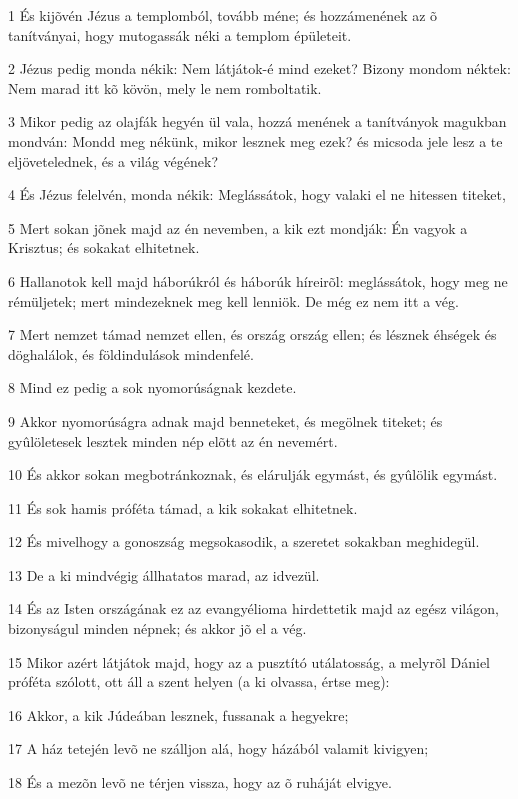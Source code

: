 \par 1 És kijõvén Jézus a templomból, tovább méne; és hozzámenének az õ tanítványai, hogy mutogassák néki a templom épületeit.
\par 2 Jézus pedig monda nékik: Nem látjátok-é mind ezeket? Bizony mondom néktek: Nem marad itt kõ kövön, mely le nem romboltatik.
\par 3 Mikor pedig az olajfák hegyén ül vala, hozzá menének a tanítványok magukban mondván: Mondd meg nékünk, mikor lesznek meg ezek? és micsoda jele lesz a te eljövetelednek, és a világ végének?
\par 4 És Jézus felelvén, monda nékik: Meglássátok, hogy valaki el ne hitessen titeket,
\par 5 Mert sokan jõnek majd az én nevemben, a kik ezt mondják: Én vagyok a Krisztus; és sokakat elhitetnek.
\par 6 Hallanotok kell majd háborúkról és háborúk híreirõl: meglássátok, hogy meg ne rémüljetek; mert mindezeknek meg kell lenniök. De még ez nem itt a vég.
\par 7 Mert nemzet támad nemzet ellen, és ország ország ellen; és lésznek éhségek és döghalálok, és földindulások mindenfelé.
\par 8 Mind ez pedig a sok nyomorúságnak kezdete.
\par 9 Akkor nyomorúságra adnak majd benneteket, és megölnek titeket; és gyûlöletesek lesztek minden nép elõtt az én nevemért.
\par 10 És akkor sokan megbotránkoznak, és elárulják egymást, és gyûlölik egymást.
\par 11 És sok hamis próféta támad, a kik sokakat elhitetnek.
\par 12 És mivelhogy a gonoszság megsokasodik, a szeretet sokakban meghidegül.
\par 13 De a ki mindvégig állhatatos marad, az idvezül.
\par 14 És az Isten országának ez az evangyélioma hirdettetik majd az egész világon,  bizonyságul minden népnek; és akkor jõ el a vég.
\par 15 Mikor azért látjátok majd, hogy az a pusztító utálatosság, a melyrõl Dániel próféta szólott, ott áll a szent helyen (a ki olvassa, értse meg):
\par 16 Akkor, a kik Júdeában lesznek, fussanak a hegyekre;
\par 17 A ház tetején levõ ne szálljon alá, hogy házából valamit kivigyen;
\par 18 És a mezõn levõ ne térjen vissza, hogy az õ ruháját elvigye.
